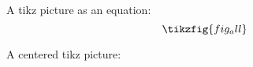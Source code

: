 \documentclass{article}
\begin{document}
A tikz picture as an equation:
\begin{equation}
  \tikzfig{fig_all}
\end{equation}

A centered tikz picture:
\end{document}
